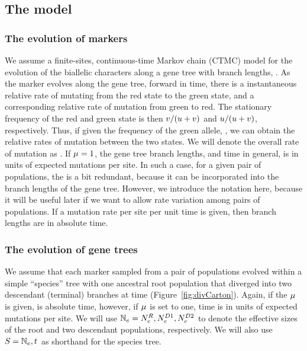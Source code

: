 \subsection{The model}

\subsubsection{The evolution of markers}

We assume a finite-sites, continuous-time Markov chain (CTMC) model for the
evolution of the biallelic characters along a gene tree with branch lengths,
\genetree.
As the marker evolves along the gene tree, forward in time, there is a
instantaneous relative rate \rgmurate of mutating from the red state to the
green state, and a corresponding relative rate \grmurate of mutation from green
to red.
The stationary frequency of the red and green state is then
$\grmurate / (\rgmurate + \grmurate)$
and
$\rgmurate / (\rgmurate + \grmurate)$, respectively.
Thus, if given the frequency of the green allele, \gfreq, we can obtain the
relative rates of mutation between the two states.
We will denote the overall rate of mutation as \murate.
If $\murate = 1$, the gene tree branch lengths, and time in general, is in
units of expected mutations per site.
In such a case, for a given pair of populations, the \murate is a bit
redundant, because it can be incorporated into the branch lengths of the gene
tree.
However, we introduce the notation here, because it will be useful later if we
want to allow rate variation among pairs of populations.
If a mutation rate per site per unit time is given, then branch lengths are in
absolute time.

\subsubsection{The evolution of gene trees}

We assume that each marker sampled from a pair of populations evolved within a
simple ``species'' tree with one ancestral root population that diverged into
two descendant (terminal) branches at time \comparisondivtime
(Figure~\ref{fig:divCarton}).
Again, if the $\murate$ is given, \comparisondivtime is absolute time, however,
if $\murate$ is set to one, time is in units of expected mutations per site.
We will use
$\comparisonpopsizes = \epopsize[\rootpopindex],
\epopsize[\descendantpopindex{1}], \epopsize[\descendantpopindex{2}]$
to denote
the effective sizes of the root and two descendant populations, respectively.
We will also use $\sptree = \comparisonpopsizes, \comparisondivtime$ as
shorthand for the species tree.

